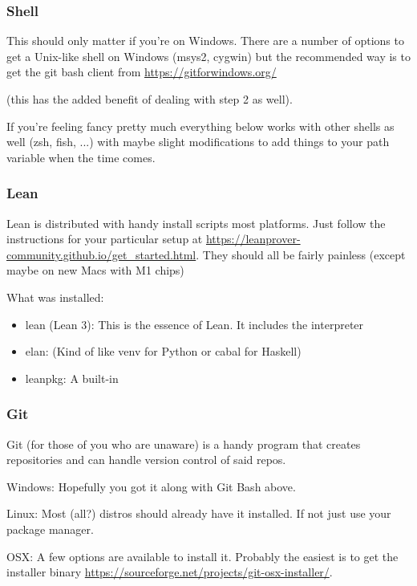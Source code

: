 \documentclass{beamer}
\begin{document}
\begin{frame}
    \frametitle{Shell}

    This should only matter if you're on Windows. There are a number of options to get a Unix-like shell on Windows (msys2, cygwin) but the recommended way is to get the git bash client from \url{https://gitforwindows.org/}

    (this has the added benefit of dealing with step 2 as well).
    \vspace{10pt}

    If you're feeling fancy pretty much everything below works with other shells as well (zsh, fish, ...) with maybe slight modifications to add things to your path variable when the time comes.
    

\end{frame}
\begin{frame}
    \frametitle{Lean}

    Lean is distributed with handy install scripts most platforms. Just follow the instructions for your particular setup at \url{https://leanprover-community.github.io/get_started.html}. They should all be fairly painless (except maybe on new Macs with M1 chips)
    \vspace{10pt}

    What was installed:
    \begin{itemize}
        \item lean (Lean 3): This is the essence of Lean. It includes the interpreter
        \item elan: (Kind of like venv for Python or cabal for Haskell)
        \item leanpkg: A built-in
    \end{itemize}

\end{frame}

\begin{frame}
    \frametitle{Git}

    Git (for those of you who are unaware) is a handy program that creates repositories and can handle version control of said repos. 
    \vspace{10pt}

    Windows: Hopefully you got it along with Git Bash above. 
    \vspace{10pt}

    Linux: Most (all?) distros should already have it installed. If not just use your package manager.
    \vspace{10pt}

    OSX: A few options are available to install it. Probably the easiest is to get the installer binary \url{https://sourceforge.net/projects/git-osx-installer/}.
    \vspace{10pt}
\end{frame}
\end{document}
